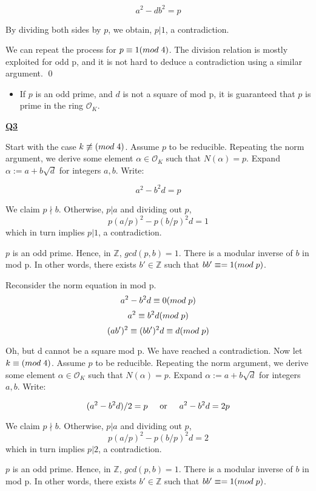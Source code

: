 \documentclass{article}
\newcommand{\new}[1]{
    \vspace{2mm}
    \noindent
    \textbf{
    \underline{#1}}
}
\def\ZZ{{\mathbb{Z}}}
\def\_{{\hspace{1mm}}}
\def\contradiction{{\lightning}}
\newcommand{\textOr}{
    \hspace{5mm}
    \textrm{or}
    \hspace{5mm}
}
\newcommand{\<}{{{
    \langle
}}}
\def\ZZ{{\mathbb{Z}}}
\newcommand{\ringInt}{
    {\mathcal{O}}
}
\begin{document}
\[
a^2-db^2 = p
\]

By dividing both sides by $p$, we obtain, $p|1$, a contradiction. 
\contradiction

We can repeat the process for $p \equiv 1 (mod\_4)$. The 
division relation is mostly exploited for odd p, and it is not 
hard to deduce a contradiction using a similar argument. 
\qed

\newpage

\begin{itemize}
    \item If $p$ is an odd prime, and $d$ is not a square of 
    mod p, it is guaranteed that $p$ is prime in the ring 
    $\ringInt_K$. 
\end{itemize}


\new{Q3}
Start with the case $k \not\equiv (mod\_4)$. Assume $p$ to 
be reducible. Repeating the norm argument, we derive 
some element $\alpha \in \ringInt_K$ such that $N(\alpha) = p$. 
Expand $\alpha := a+b\sqrt{d}$ for integers $a, b$. Write:

\[
    a^2-b^2d = p
\]

We claim $p\nmid b$. Otherwise, $p|a$ and dividing out $p$, 
\[
    p(a/p)^2-p(b/p)^2d=1
\]
which in turn implies $p|1$, a contradiction. 

$p$ is an odd prime. Hence, in $\ZZ$, $gcd(p, b) = 1$. There 
is a modular inverse of $b$ in mod p. In other words, there exists 
$b' \in \ZZ$ such that $bb' \equiv = 1(mod \_ p)$. 

Reconsider the norm equation in mod p. 
\[
    a^2 - b^2d \equiv 0 (mod\_p)
\]
\[
    a^2 \equiv b^2d (mod\_p)
\]
\[
    (ab')^2 \equiv (bb')^2d \equiv d (mod\_p)
\]

Oh, but d cannot be a square mod p. We have reached a contradiction. 
\contradiction
Now let $k \equiv (mod\_4)$. Assume $p$ to 
be reducible. Repeating the norm argument, we derive 
some element $\alpha \in \ringInt_K$ such that $N(\alpha) = p$. 
Expand $\alpha := a+b\sqrt{d}$ for integers $a, b$. Write:

\[
    (a^2-b^2d)/2 = p 
    \textOr
a^2-b^2d = 2p 
\]

We claim $p\nmid b$. Otherwise, $p|a$ and dividing out $p$, 
\[
    p(a/p)^2-p(b/p)^2d=2
\]
which in turn implies $p|2$, a contradiction. 

$p$ is an odd prime. Hence, in $\ZZ$, $gcd(p, b) = 1$. There 
is a modular inverse of $b$ in mod p. In other words, there exists 
$b' \in \ZZ$ such that $bb' \equiv = 1(mod \_ p)$. 
\end{document}
